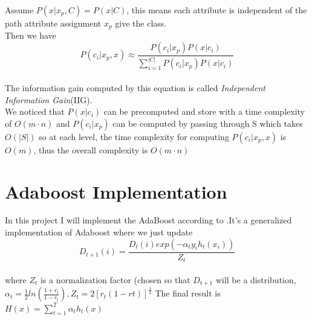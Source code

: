\documentclass[11pt,twocolumn]{article}
\begin{document}
\par{
Assume
	$P(x|x_p,C) = P(x|C)$, 
this means each attribute is independent of the path attribute assignment $x_p$ give the class.\\
Then we have \\
\[P(c_i|x_p,x) \approx \frac{P(c_i|x_p)P(x|c_i)}{\sum_{i=1}^{|C|} P(c_i|x_p)P(x|c_i)}\]\\
The information gain computed by this equation is called \textit{Independent Information Gain}(IIG).\\
We noticed that $P(x|c_i)$ can be precomputed and store with a time complexity of $O(m \cdot n)$ and $P(c_i|x_p)$ can be 
computed by passing through S which takes $O(|S|)$  so at each level, the time complexity for computing $P(c_i|x_p,x)$ is $O(m)$, thus the overall complexity is $O(m \cdot n)$
}

\section{Adaboost Implementation}
\par{
In this project I will implement the AdaBoost according to \cite{Schapire}.It's a generalized implementation of Adaboost where we just update \\
\[D_{t+1}(i) = \frac{D_t(i)exp(- \alpha_t y_i h_t(x_i))}{Z_t}\] \\
where $Z_t$ is a normalization factor (chosen so that $D_{t+1}$ will be a distribution, $\alpha_t = \frac{1}{2} ln(\frac{1+r_t}{1-r_t}), Z_t = 2[r_t(1-rt)]^{\frac{1}{2}}$
The final result is $H(x) = \sum_{t=1}^{T} \alpha_t h_t(x)$ }
\end{document}
